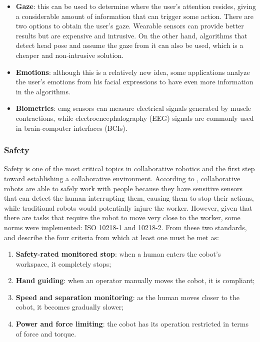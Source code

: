 \begin{itemize}
\item \textbf{Gaze}: this can be used to determine where the user's attention resides, giving a considerable amount of information that can trigger some action. There are two options to obtain the user's gaze. Wearable sensors can provide better results but are expensive and intrusive. On the other hand, algorithms that detect head pose and assume the gaze from it can also be used, which is a cheaper and non-intrusive solution.

\item \textbf{Emotions}: although this is a relatively new idea, some applications analyze the user's emotions from his facial expressions to have even more information in the algorithms.

\item \textbf{Biometrics}: \acf{emg} sensors can measure electrical signals generated by muscle contractions, while electroencephalography (EEG) signals are commonly used in brain-computer interfaces (BCIs). %

\end{itemize}

\subsubsection{Safety}

Safety is one of the most critical topics in collaborative robotics and the first step toward establishing a collaborative environment. According to \cite{CobotsWW}, collaborative robots are able to safely work with people because they have sensitive sensors that can detect the human interrupting them, causing them to stop their actions, while traditional robots would potentially injure the worker. However, given that there are tasks that require the robot to move very close to the worker, some norms were implemented: ISO 10218-1 and 10218-2. From these two standards, \textcite{Castro2021} and \textcite{Villani2018} describe the four criteria from which at least one must be met as:
\begin{enumerate}
  \item \textbf{Safety-rated monitored stop}: when a human enters the cobot's workspace, it completely stops;
  \item \textbf{Hand guiding}: when an operator manually moves the cobot, it is compliant;
  \item \textbf{Speed and separation monitoring}: as the human moves closer to the cobot, it becomes gradually slower;
  \item \textbf{Power and force limiting}: the cobot has its operation restricted in terms of force and torque.
\end{enumerate}

